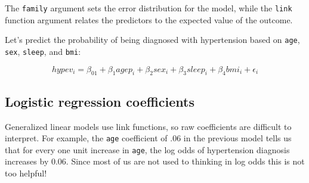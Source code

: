 \documentclass[]{book}
\newenvironment{Shaded}{\begin{snugshade}}{\end{snugshade}}
\newcommand{\KeywordTok}[1]{\textcolor[rgb]{0.13,0.29,0.53}{\textbf{#1}}}
\newcommand{\DataTypeTok}[1]{\textcolor[rgb]{0.13,0.29,0.53}{#1}}
\newcommand{\DecValTok}[1]{\textcolor[rgb]{0.00,0.00,0.81}{#1}}
\newcommand{\StringTok}[1]{\textcolor[rgb]{0.31,0.60,0.02}{#1}}
\newcommand{\CommentTok}[1]{\textcolor[rgb]{0.56,0.35,0.01}{\textit{#1}}}
\newcommand{\OperatorTok}[1]{\textcolor[rgb]{0.81,0.36,0.00}{\textbf{#1}}}
\newcommand{\NormalTok}[1]{#1}
\begin{document}
The \texttt{family} argument sets the error distribution for the model,
while the \texttt{link} function argument relates the predictors to the
expected value of the outcome.

Let's predict the probability of being diagnosed with hypertension based
on \texttt{age}, \texttt{sex}, \texttt{sleep}, and \texttt{bmi}:

\[
hypev_i = \beta_01 + \beta_1agep_i + \beta_2sex_i + \beta_3sleep_i + \beta_4bmi_i + \epsilon_i
\]

\begin{Shaded}
\end{Shaded}

\subsection{Logistic regression
coefficients}\label{logistic-regression-coefficients}

Generalized linear models use link functions, so raw coefficients are
difficult to interpret. For example, the \texttt{age} coefficient of .06
in the previous model tells us that for every one unit increase in
\texttt{age}, the log odds of hypertension diagnosis increases by 0.06.
Since most of us are not used to thinking in log odds this is not too
helpful!
\end{document}
